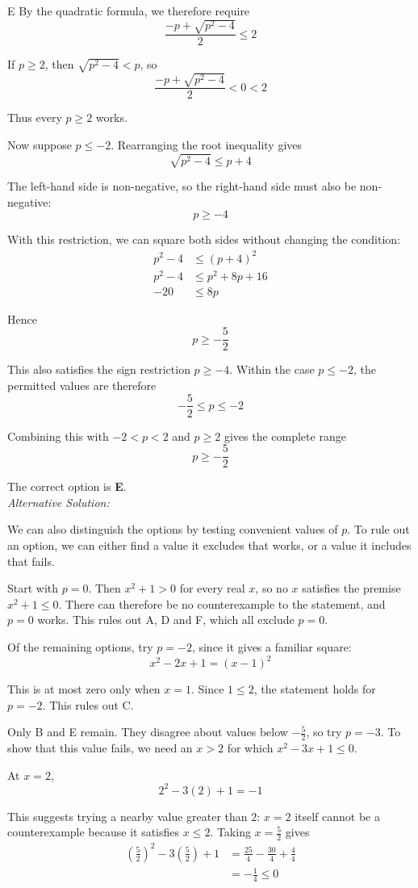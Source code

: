 \documentclass[11pt,a4paper]{article}
\begin{document}
\begin{enumerate}[label=\textbf{\arabic*.},leftmargin=*,itemsep=0pt,start=17]
\begin{djsSolution}{E}
By the quadratic formula, we therefore require
\[
\frac{-p+\sqrt{p^2-4}}2\le2
\]

If $p\ge2$, then $\sqrt{p^2-4}<p$, so
\[
\frac{-p+\sqrt{p^2-4}}2<0<2
\]

Thus every $p\ge2$ works.

Now suppose $p\le-2$. Rearranging the root inequality gives
\[
\sqrt{p^2-4}\le p+4
\]

The left-hand side is non-negative, so the right-hand side must also be non-negative:
\[
p\ge-4
\]

With this restriction, we can square both sides without changing the condition:
\[
\begin{aligned}
p^2-4&\le(p+4)^2\\[5pt]
p^2-4&\le p^2+8p+16\\[5pt]
-20&\le8p
\end{aligned}
\]

Hence
\[
p\ge-\frac52
\]

This also satisfies the sign restriction $p\ge-4$. Within the case $p\le-2$, the permitted values are therefore
\[
-\frac52\le p\le-2
\]

Combining this with $-2<p<2$ and $p\ge2$ gives the complete range
\[
p\ge-\frac52
\]

The correct option is \textbf{E}.\\[5pt]

\textit{Alternative Solution:}

We can also distinguish the options by testing convenient values of $p$. To rule out an option, we can either find a value it excludes that works, or a value it includes that fails.

Start with $p=0$. Then $x^2+1>0$ for every real $x$, so no $x$ satisfies the premise $x^2+1\le0$. There can therefore be no counterexample to the statement, and $p=0$ works. This rules out A, D and F, which all exclude $p=0$.

Of the remaining options, try $p=-2$, since it gives a familiar square:
\[
x^2-2x+1=(x-1)^2
\]

This is at most zero only when $x=1$. Since $1\le2$, the statement holds for $p=-2$. This rules out C.

Only B and E remain. They disagree about values below $-\frac52$, so try $p=-3$. To show that this value fails, we need an $x>2$ for which $x^2-3x+1\le0$.

At $x=2$,
\[
2^2-3(2)+1=-1
\]

This suggests trying a nearby value greater than $2$: $x=2$ itself cannot be a counterexample because it satisfies $x\le2$. Taking $x=\frac52$ gives
\[
\begin{aligned}
\left(\frac52\right)^2-3\left(\frac52\right)+1
&=\frac{25}{4}-\frac{30}{4}+\frac44\\[5pt]
&=-\frac14\le0
\end{aligned}
\]


\end{djsSolution}
\end{enumerate}
\end{document}
